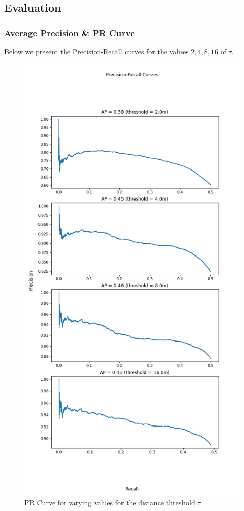 \documentclass[letter]{article}
\begin{document}
	\subsection{Evaluation}
	\setcounter{subsubsection}{2}
	\subsubsection{Average Precision \& PR Curve}
	Below we present the Precision-Recall curves for the values $2, 4, 8, 16$ of $\tau$.
	\begin{figure}[h]
		\centering
		\includegraphics[scale=0.42]{images/prcurve.png}
		\caption{PR Curve for varying values for the distance threshold $\tau$}
		\label{fig:prcurve}
	\end{figure}
\end{document}
